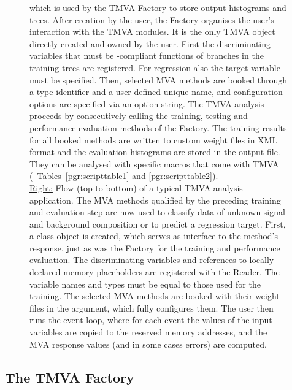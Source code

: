 \begin{figure}[p]
{         which is used by the TMVA Factory to store output histograms 
         and trees. After creation by the user, the Factory organises the 
         user's interaction with the TMVA modules. It is the only TMVA object 
         directly created and owned by the user. First the discriminating
         variables that must be -compliant functions of 
         branches in the training trees are registered. For regression also
         the target variable must be specified. Then, selected MVA methods
         are booked through a type identifier and a user-defined unique name,
         and configuration options are specified via an option string. 
         The TMVA analysis proceeds by consecutively calling the training, 
         testing and performance evaluation methods of the Factory. The training 
         results for all booked methods are written to custom weight files in 
         XML format and the evaluation histograms are stored in the output file. 
         They can be analysed with specific macros that come with TMVA (\cf\  
         Tables~\ref{pgr:scripttable1} and \ref{pgr:scripttable2}). \\
         \underline{Right:} Flow (top to bottom) of a typical 
         TMVA analysis application. The MVA methods qualified by the preceding 
         training and evaluation step are now used to classify data of unknown 
         signal and background composition or to predict a regression target. 
         First, a \code{Reader} class object is created, which 
         serves as interface to the method's response, just as was the Factory 
         for the training and performance evaluation. The discriminating variables 
         and references to locally declared memory placeholders are registered
         with the Reader. The variable names and types must be equal to those
         used for the training. The selected MVA methods are booked with their 
         weight files in the argument, which fully configures them. The user 
         then runs the event loop, where for each event the values of the input
         variables are copied to the reserved memory addresses, and the MVA
         response values (and in some cases errors) are computed.
         \index{Factory}\index{Reader}\index{TMVA analysis flow}
}
\label{fig:TMVAflow}
\end{figure}

\subsection{The TMVA Factory}

